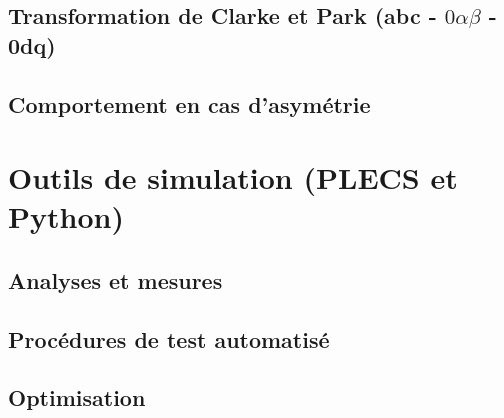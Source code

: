 \section{Transformation de Clarke et Park (abc - $0\alpha\beta$ - 0dq)}

\section{Comportement en cas d'asymétrie}

\chapter{Outils de simulation (PLECS et Python)}

\section{Analyses et mesures}

\section{Procédures de test automatisé}

\section{Optimisation}
